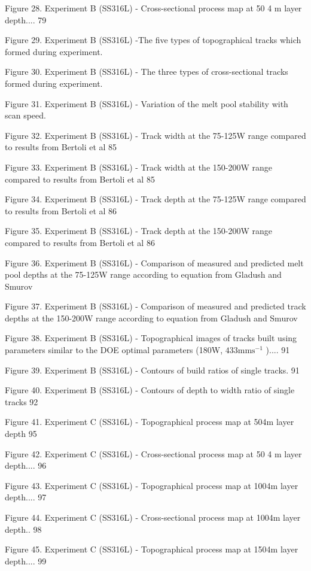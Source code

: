 \documentclass[10pt]{article}
\begin{document}
Figure 28. Experiment B (SS316L) - Cross-sectional process map at 50 4 m layer depth.... 79

Figure 29. Experiment B (SS316L) -The five types of topographical tracks which formed during experiment.

Figure 30. Experiment B (SS316L) - The three types of cross-sectional tracks formed during experiment.

Figure 31. Experiment B (SS316L) - Variation of the melt pool stability with scan speed.

Figure 32. Experiment B (SS316L) - Track width at the 75-125W range compared to results from Bertoli et al 85

Figure 33. Experiment B (SS316L) - Track width at the 150-200W range compared to results from Bertoli et al 85

Figure 34. Experiment B (SS316L) - Track depth at the 75-125W range compared to results from Bertoli et al 86

Figure 35. Experiment B (SS316L) - Track depth at the 150-200W range compared to results from Bertoli et al 86

Figure 36. Experiment B (SS316L) - Comparison of measured and predicted melt pool depths at the 75-125W range according to equation from Gladush and Smurov

Figure 37. Experiment B (SS316L) - Comparison of measured and predicted track depths at the 150-200W range according to equation from Gladush and Smurov

Figure 38. Experiment B (SS316L) - Topographical images of tracks built using parameters similar to the DOE optimal parameters (180W, $433 \mathrm{mms}^{-1}$ ).... 91

Figure 39. Experiment B (SS316L) - Contours of build ratios of single tracks. 91

Figure 40. Experiment B (SS316L) - Contours of depth to width ratio of single tracks 92

Figure 41. Experiment C (SS316L) - Topographical process map at 504m layer depth 95

Figure 42. Experiment C (SS316L) - Cross-sectional process map at 50 4 m layer depth.... 96

Figure 43. Experiment C (SS316L) - Topographical process map at 1004m layer depth.... 97

Figure 44. Experiment C (SS316L) - Cross-sectional process map at 1004m layer depth.. 98

Figure 45. Experiment C (SS316L) - Topographical process map at 1504m layer depth.... 99
\end{document}
